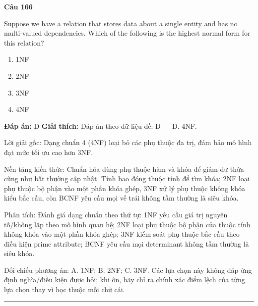 \documentclass[11pt,a4paper]{article}
\newenvironment{question}[1]{%
  \par\vspace{1em}\noindent\textbf{\large Câu #1}\par\vspace{0.4em}
}{%
  \par\vspace{1em}\hrule\vspace{0.6em}
}
\newenvironment{choices}{%
  \begin{enumerate}[label=\textbf{\Alph*.},leftmargin=2.2em,itemsep=2pt,topsep=3pt]
}{%
  \end{enumerate}
}
\newcommand{\choice}{\item}
\begin{document}
\begin{question}{166}
Suppose we have a relation that stores data about a single entity and has no multi-valued dependencies. Which of the following is the highest normal form for this relation?
\begin{choices}
\choice 1NF
\choice 2NF
\choice 3NF
\choice 4NF
\end{choices}
\textbf{Đáp án:} D
\textbf{Giải thích:} Đáp án theo dữ liệu đề: D — D. 4NF.

Lời giải gốc: Dạng chuẩn 4 (4NF) loại bỏ các phụ thuộc đa trị, đảm bảo mô hình đạt mức tối ưu cao hơn 3NF.

Nền tảng kiến thức: Chuẩn hóa dùng phụ thuộc hàm và khóa để giảm dư thừa cũng như bất thường cập nhật. Tính bao đóng thuộc tính để tìm khóa; 2NF loại phụ thuộc bộ phận vào một phần khóa ghép, 3NF xử lý phụ thuộc không khóa kiểu bắc cầu, còn BCNF yêu cầu mọi vế trái không tầm thường là siêu khóa.

Phân tích: Đánh giá dạng chuẩn theo thứ tự: 1NF yêu cầu giá trị nguyên tố/không lặp theo mô hình quan hệ; 2NF loại phụ thuộc bộ phận của thuộc tính không khóa vào một phần khóa ghép; 3NF kiểm soát phụ thuộc bắc cầu theo điều kiện prime attribute; BCNF yêu cầu mọi determinant không tầm thường là siêu khóa.

Đối chiếu phương án: A. 1NF; B. 2NF; C. 3NF. Các lựa chọn này không đáp ứng định nghĩa/điều kiện được hỏi; khi ôn, hãy chỉ ra chính xác điểm lệch của từng lựa chọn thay vì học thuộc mỗi chữ cái.
\end{question}
\end{document}
